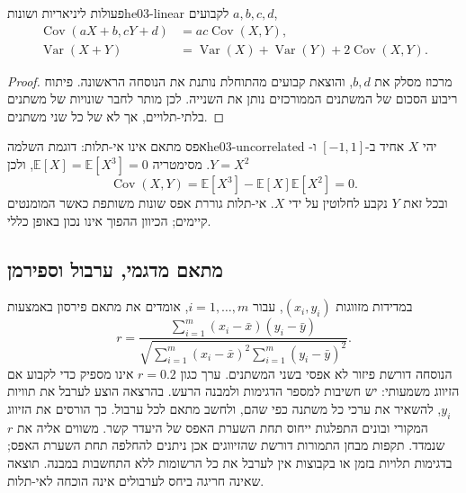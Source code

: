 \begin{proposition}{פעולות ליניאריות ושונות}{he03-linear}
לקבועים $a,b,c,d$,
\begin{align}
\operatorname{Cov}(aX+b,cY+d)&=ac\operatorname{Cov}(X,Y),\label{eq:he03-affine}\\
\operatorname{Var}(X+Y)&=\operatorname{Var}(X)+\operatorname{Var}(Y)
+2\operatorname{Cov}(X,Y).\label{eq:he03-sumvar}
\end{align}
\end{proposition}
\begin{proof}
מרכוז מסלק את $b,d$, והוצאת קבועים מהתוחלת נותנת את הנוסחה הראשונה. פיתוח ריבוע הסכום של המשתנים הממורכזים נותן את השנייה. לכן מותר לחבר שונויות של משתנים בלתי-תלויים, אך לא של כל שני משתנים.
\end{proof}

\begin{example}{אפס מתאם אינו אי-תלות: דוגמת השלמה}{he03-uncorrelated}
יהי $X$ אחיד ב-$[-1,1]$ ו-$Y=X^2$. מסימטריה $\mathbb{E}[X]=\mathbb{E}[X^3]=0$, ולכן
\begin{equation}\label{eq:he03-square-example}
\operatorname{Cov}(X,Y)=\mathbb{E}[X^3]-\mathbb{E}[X]\mathbb{E}[X^2]=0.
\end{equation}
ובכל זאת $Y$ נקבע לחלוטין על ידי $X$. אי-תלות גוררת אפס שונות משותפת כאשר המומנטים קיימים; הכיוון ההפוך אינו נכון באופן כללי.
\end{example}

\subsection{מתאם מדגמי, ערבול וספירמן}\label{sec:he03-spearman}
במדידות מזווגות $(x_i,y_i)$, עבור $i=1,\ldots,m$, אומדים את מתאם פירסון באמצעות
\begin{equation}\label{eq:he03-sample-pearson}
r=\frac{\sum_{i=1}^m(x_i-\bar x)(y_i-\bar y)}
{\sqrt{\sum_{i=1}^m(x_i-\bar x)^2\sum_{i=1}^m(y_i-\bar y)^2}}.
\end{equation}
הנוסחה דורשת פיזור לא אפסי בשני המשתנים. ערך כגון $r=0.2$ אינו מספיק כדי לקבוע אם הזיווג משמעותי: יש חשיבות למספר הדגימות ולמבנה הרעש. בהרצאה הוצע לערבל את תוויות $y_i$, להשאיר את ערכי כל משתנה כפי שהם, ולחשב מתאם לכל ערבול. כך הורסים את הזיווג המקורי ובונים התפלגות ייחוס תחת השערת האפס של היעדר קשר. משווים אליה את $r$ שנמדד. תקפות מבחן התמורות דורשת שהזיווגים אכן ניתנים להחלפה תחת השערת האפס; בדגימות תלויות בזמן או בקבוצות אין לערבל את כל הרשומות ללא התחשבות במבנה. תוצאה שאינה חריגה ביחס לערבולים אינה הוכחה לאי-תלות.

